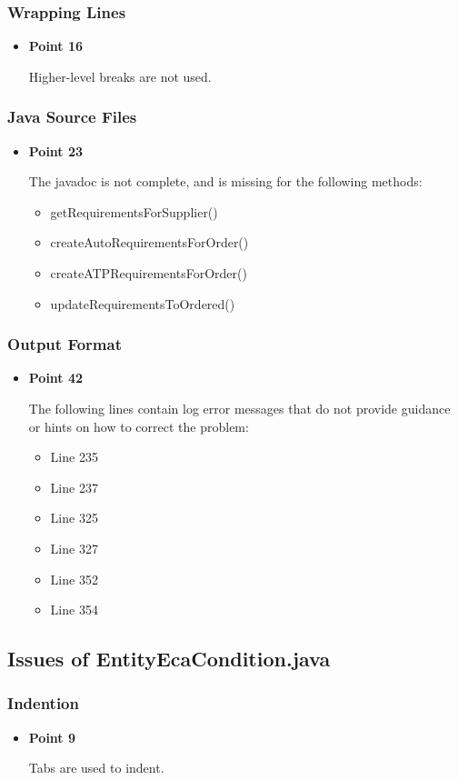 \documentclass[a4paper,11pt]{article}
\begin{document}
	\subsubsection{Wrapping Lines}
	\begin{itemize}
	\item \textbf{Point 16} 
	
	Higher-level breaks are not used.
	\end{itemize}
	\subsubsection{Java Source Files}
	\begin{itemize}
	\item \textbf{Point 23} 
	
	The javadoc is not complete, and is missing for the following methods:
	\begin{itemize}
		\item getRequirementsForSupplier()
		\item createAutoRequirementsForOrder()
		\item createATPRequirementsForOrder()
		\item updateRequirementsToOrdered()
	\end{itemize}
	\end{itemize}
	\subsubsection{Output Format}
	\begin{itemize}
	\item \textbf{Point 42} 
	
	The following lines contain log error messages that do not provide guidance or hints on how to correct the problem:
	\begin{itemize}
	\item Line 235
	\item Line 237
	\item Line 325
	\item Line 327
	\item Line 352
	\item Line 354
	\end{itemize}
	\end{itemize}
	
	\subsection{Issues of EntityEcaCondition.java}
	\subsubsection{Indention}
	\begin{itemize}
	\item \textbf{Point 9} 
	
	Tabs are used to indent.
	\end{itemize}
	
\end{document}
